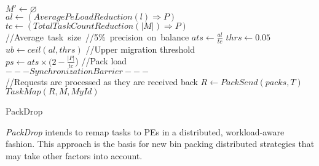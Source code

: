 \begin{algorithm}
	\DontPrintSemicolon
    $  M' \gets \varnothing$\\
    $al \gets (AveragePeLoadReduction(l)\Rightarrow  P)$ \\
    $tc \gets (TotalTaskCountReduction(|  M|)\Rightarrow  P)$\\
    //Average~task~size~\quad//5\%~precision~on~balance\qquad
    $ats\gets \frac{al}{tc}$ \qquad\qquad $thrs \gets 0.05$\\
    $ub \gets ceil(al,thrs)$ \qquad //Upper migration threshold\\
    $ps \gets ats\times (2-\frac{|  P|}{tc}$) \qquad\qquad //Pack load\\
    $---Synchronization Barrier---$\\
    //Requests are processed as they are received back
    $R \gets PackSend(packs, T)$\\
    $TaskMap(R,   M, MyId)$
    \caption{PackDrop}
    \label{algo:packdrop}    
\end{algorithm}

\textit{PackDrop} intends to remap tasks to PEs in a distributed, workload-aware fashion.
This approach is the basis for new bin packing distributed strategies that may take other factors into account.

